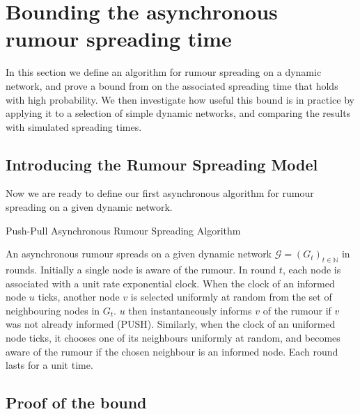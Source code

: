 \section{Bounding the asynchronous rumour spreading time}
\label{AsyncUpperBoundSection}

In this section we define an algorithm for rumour spreading on a dynamic network, and prove a bound from \cite{asyncPaper} on the associated spreading time that holds with high probability. We then investigate how useful this bound is in practice by applying it to a selection of simple dynamic networks, and comparing the results with simulated spreading times. 

\subsection{Introducing the Rumour Spreading Model}
Now we are ready to define our first asynchronous algorithm for rumour spreading on a given dynamic network.

\begin{definition}
	Push-Pull Asynchronous Rumour Spreading Algorithm 
\end{definition}
\label{NodeCentricAsyncAlgorithm}

\noindent
An asynchronous rumour spreads on a given dynamic network $\mathcal{G} = (G_t)_{t\in \mathbb{N}}$ in rounds. Initially a single node is aware of the rumour. In round $t$, each node is associated with a unit rate exponential clock. When the clock of an informed node $u$ ticks, another node $v$ is selected uniformly at random from the set of neighbouring nodes in $G_t$. $u$ then instantaneously informs $v$ of the rumour if $v$ was not already informed (PUSH). Similarly, when the clock of an uniformed node ticks, it chooses one of its neighbours uniformly at random, and becomes aware of the rumour if the chosen neighbour is an informed node. Each round lasts for a unit time. %




\subsection{Proof of the bound}

